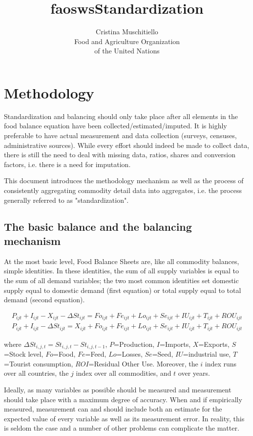 \documentclass[nojss]{jss}
\title{\bf faoswsStandardization}
\author{Cristina Muschitiello \\ Food and Agriculture Organization \\ of
  the United Nations}
\begin{document}

\newpage

\section{Methodology}
Standardization and balancing should only take place after all elements in the food balance equation have been collected/estimated/imputed. It is highly preferable to have actual measurement and data collection (surveys, censuses, administrative sources). While every effort should indeed be made to collect data, there is still the need to deal with missing data, ratios, shares and conversion factors, i.e. there is a need for imputation.

This document introduces the methodology mechanism as well as the process of consistently aggregating commodity detail data into aggregates, i.e. the process generally referred to as "standardization".


\subsection{The basic balance and the balancing mechanism}

At the most basic level, Food Balance Sheets are, like all commodity balances, simple identities. In these identities, the sum of all supply variables is equal to the sum of all demand variables; the two most common identities set domestic supply equal to domestic demand (first equation) or total supply equal to total demand (second equation). 

\begin{align}
     P_{ijt} + I_{ijt} - X_{ijt} - \Delta St_{ijt} = Fo_{ijt} + Fe_{ijt} + Lo_{ijt} + Se_{ijt} + IU_{ijt} + T_{ijt}  + ROU_{ijt}\\
     P_{ijt} + I_{ijt} - \Delta St_{ijt} = X_{ijt} + Fo_{ijt} + Fe_{ijt} + Lo_{ijt} + Se_{ijt} + IU_{ijt} + T_{ijt} + ROU_{ijt}
\end{align}

where $\Delta St_{i,j,t} = St_{i,j,t} - St_{i,j,t-1}$, $P$=Production, $I$=Imports, $X$=Exports, $S$=Stock level, $Fo$=Food, $Fe$=Feed, $Lo$=Losses, $Se$=Seed, $IU$=industrial use, $T$=Tourist consumption, $ROI$=Residual Other Use.  Moreover, the $i$ index runs over all countries, the $j$ index over all commodities, and $t$ over years.

Ideally, as many variables as possible should be measured and measurement should take place with a maximum degree of accuracy. When and if empirically measured, measurement can and should include both an estimate for the expected value of every variable as well as its measurement error. In reality, this is seldom the case and a number of other problems can complicate the matter. 
\end{document}
